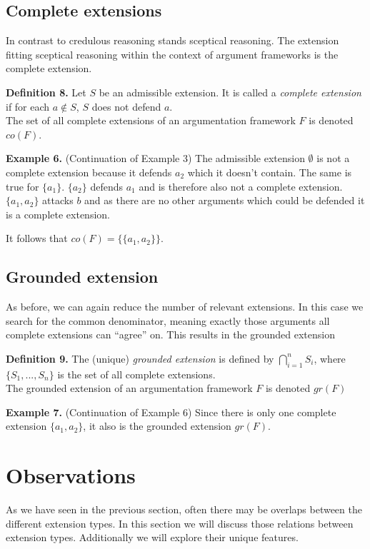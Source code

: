 \documentclass[draft,final]{vutinfth} %
\newcommand{\hl}{\par\vspace{6pt}} %
\newcommand{\cl}{\par\vspace{12pt}} %
\begin{document}
\section{Complete extensions}

In contrast to credulous reasoning stands sceptical reasoning. The extension fitting sceptical reasoning within the context of argument frameworks is the complete extension.\cl

\textbf{Definition 8.} Let $S$ be an admissible extension. It is called a \emph{complete extension} if for each $a\not\in S$, $S$ does not defend $a$.\\
The set of all complete extensions of an argumentation framework $F$ is denoted $co(F)$.\cl

\textbf{Example 6.} (Continuation of Example 3) The admissible extension $\emptyset$ is not a complete extension because it defends $a_2$ which it doesn't contain. The same is true for $\{a_1\}$. $\{a_2\}$ defends $a_1$ and is therefore also not a complete extension.\\
$\{a_1,a_2\}$ attacks $b$ and as there are no other arguments which could be defended it is a complete extension.\hl
It follows that $co(F)=\{\{a_1,a_2\}\}$.\cl

\section{Grounded extension}

As before, we can again reduce the number of relevant extensions. In this case we search for the common denominator, meaning exactly those arguments all complete extensions can ``agree'' on. This results in the grounded extension\cl

\textbf{Definition 9.} The (unique) \emph{grounded extension} is defined by $\bigcap\limits_{i=1}^n{S_i}$, where $\{S_1,...,S_n\}$ is the set of all complete extensions.\\
The grounded extension of an argumentation framework $F$ is denoted $gr(F)$\cl

\textbf{Example 7.} (Continuation of Example 6) Since there is only one complete extension $\{a_1,a_2\}$, it also is the grounded extension $gr(F)$.\cl

\chapter{Observations}

As we have seen in the previous section, often there may be overlaps between the different extension types. In this section we will discuss those relations between extension types. Additionally we will explore their unique features.\cl
\end{document}
